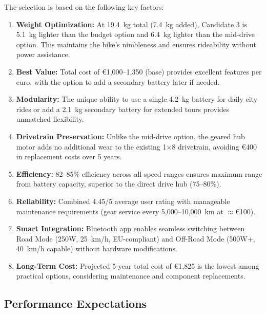 \documentclass[12pt,a4paper]{article}
\begin{document}
The selection is based on the following key factors:

\begin{enumerate}
    \item \textbf{Weight Optimization:} At 19.4~kg total (7.4~kg added), Candidate 3 is 5.1~kg lighter than the budget option and 6.4~kg lighter than the mid-drive option. This maintains the bike's nimbleness and ensures rideability without power assistance.
    
    \item \textbf{Best Value:} Total cost of €1,000--1,350 (base) provides excellent features per euro, with the option to add a secondary battery later if needed.
    
    \item \textbf{Modularity:} The unique ability to use a single 4.2~kg battery for daily city rides or add a 2.1~kg secondary battery for extended tours provides unmatched flexibility.
    
    \item \textbf{Drivetrain Preservation:} Unlike the mid-drive option, the geared hub motor adds no additional wear to the existing 1×8 drivetrain, avoiding €400 in replacement costs over 5 years.
    
    \item \textbf{Efficiency:} 82--85\% efficiency across all speed ranges ensures maximum range from battery capacity, superior to the direct drive hub (75--80\%).
    
    \item \textbf{Reliability:} Combined 4.45/5 average user rating with manageable maintenance requirements (gear service every 5,000--10,000~km at $\approx$€100).
    
    \item \textbf{Smart Integration:} Bluetooth app enables seamless switching between Road Mode (250W, 25~km/h, EU-compliant) and Off-Road Mode (500W+, 40~km/h capable) without hardware modifications.
    
    \item \textbf{Long-Term Cost:} Projected 5-year total cost of €1,825 is the lowest among practical options, considering maintenance and component replacements.
\end{enumerate}

\subsection{Performance Expectations}
\end{document}
